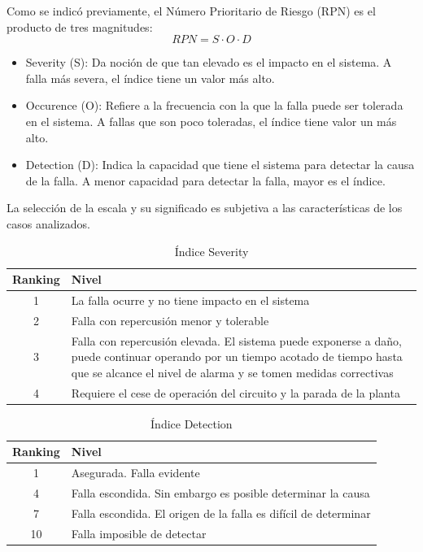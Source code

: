 \documentclass{article}
\begin{document}
Como se indicó previamente, el Número Prioritario de Riesgo (RPN) es el producto de tres magnitudes:
\begin{equation}
    RPN = S \cdot O \cdot D
\end{equation}
\begin{itemize}
    \item Severity (S): Da noción de que tan elevado es el impacto en el sistema. A falla más severa, el índice tiene un valor más alto.
    \item Occurence (O): Refiere  a  la  frecuencia  con  la  que  la  falla  puede  ser  tolerada  en  el sistema. A fallas que son poco toleradas, el índice tiene valor un más alto.
    \item Detection (D): Indica la capacidad que tiene el sistema para detectar la causa de la falla. A menor capacidad para detectar la falla, mayor es el índice.
\end{itemize}
La selección de la escala y su significado es subjetiva a las características de los casos analizados.
\begin{table}[H]
\centering
\begin{tabularx}{\textwidth}{cX}
\toprule
Ranking & Nivel \\
\midrule
1 & La falla ocurre y no tiene impacto en el sistema \\
2 & Falla con repercusión menor y tolerable \\
3 & Falla con repercusión elevada. El sistema puede exponerse a daño, puede continuar operando por un tiempo acotado de tiempo hasta que se alcance el nivel de alarma y se tomen medidas correctivas \\
4 & Requiere el cese de operación del circuito y la parada de la planta \\
\bottomrule
\end{tabularx}
\caption{Índice Severity}
\end{table}
\begin{table}[H]
\centering
\begin{tabularx}{\textwidth}{cX}
\toprule
Ranking & Nivel \\
\midrule
1 & Asegurada. Falla evidente \\
4 & Falla escondida. Sin embargo es posible determinar la causa \\
7 & Falla escondida. El origen de la falla es difícil de determinar \\
10 & Falla imposible de detectar \\
\bottomrule
\end{tabularx}
\caption{Índice Detection}
\end{table}
\end{document}
